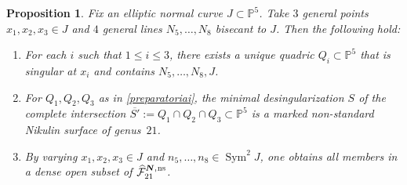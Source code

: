 \documentclass[11pt]{article}
\newcommand{\ns}{{\mkern1mu\mathrm{ns}}}
\newcommand{\bN}{\boldsymbol{N}}
\theoremstyle{plain}
\newtheorem{prop}[thm]{Proposition}
\theoremstyle{definition}
\DeclareMathOperator{\Sym}{Sym}
\newcommand\PP{{\mathbb P}}
\newcommand\F{{\mathcal F}}
\begin{document}
\begin{prop}\label{preparatoria}
Fix an elliptic normal curve $J\subset\PP^5$. Take $3$ general points $x_1,x_2,x_3\in J$ and $4$ general lines $N_5,\ldots, N_8$ bisecant to $J$. Then the following hold:
\begin{enumerate}
\item\label{preparatoriai} For each $i$ such that $1\leq i\leq 3$, there exists a unique quadric $Q_i\subset\PP^5$ that is singular at $x_i$ and contains $N_5,\ldots, N_8, J$.
\item\label{preparatoriaii} For $Q_1,Q_2,Q_3$ as in \eqref{preparatoriai}, the minimal desingularization $S$ of the complete intersection $\overline{S'}:= Q_1\cap Q_2\cap Q_3\subset \PP^5$ is a marked non-standard Nikulin surface of genus~$21$.
\item\label{preparatoriaiii} By varying $x_1,x_2,x_3\in J$ and $n_5,\ldots,n_8\in \Sym^2J$, one obtains all members in a dense open subset of $\widehat{\F}_{21}^{\bN,\ns}$.
\end{enumerate}
\end{prop}
\end{document}

